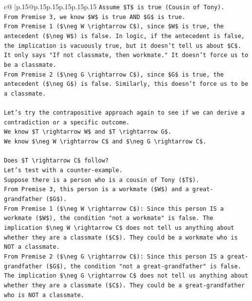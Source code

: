 \documentclass{article}
\begin{document}
{\begin{supertabular}{c@{$\;$}|p{.15\linewidth}@{}p{.15\linewidth}p{.15\linewidth}p{.15\linewidth}p{.15\linewidth}p{.15\linewidth}}
{{{\texttt{Assume \$T\$ is true (Cousin of Tony).} \\
\texttt{From Premise 3, we know \$W\$ is true AND \$G\$ is true.} \\
\texttt{From Premise 1 (\$\textbackslash{}neg W \textbackslash{}rightarrow C\$), since \$W\$ is true, the antecedent (\$\textbackslash{}neg W\$) is false. In logic, if the antecedent is false, the implication is vacuously true, but it doesn't tell us about \$C\$. It only says "If not classmate, then workmate." It doesn't force us to be a classmate.} \\
\texttt{From Premise 2 (\$\textbackslash{}neg G \textbackslash{}rightarrow C\$), since \$G\$ is true, the antecedent (\$\textbackslash{}neg G\$) is false. Similarly, this doesn't force us to be a classmate.} \\
\\ 
\texttt{Let's try the contrapositive approach again to see if we can derive a contradiction or a specific outcome.} \\
\texttt{We know \$T \textbackslash{}rightarrow W\$ and \$T \textbackslash{}rightarrow G\$.} \\
\texttt{We know \$\textbackslash{}neg W \textbackslash{}rightarrow C\$ and \$\textbackslash{}neg G \textbackslash{}rightarrow C\$.} \\
\\ 
\texttt{Does \$T \textbackslash{}rightarrow C\$ follow?} \\
\texttt{Let's test with a counter{-}example.} \\
\texttt{Suppose there is a person who is a cousin of Tony (\$T\$).} \\
\texttt{From Premise 3, this person is a workmate (\$W\$) and a great{-}grandfather (\$G\$).} \\
\texttt{From Premise 1 (\$\textbackslash{}neg W \textbackslash{}rightarrow C\$): Since this person IS a workmate (\$W\$), the condition "not a workmate" is false. The implication \$\textbackslash{}neg W \textbackslash{}rightarrow C\$ does not tell us anything about whether they are a classmate (\$C\$). They could be a workmate who is NOT a classmate.} \\
\texttt{From Premise 2 (\$\textbackslash{}neg G \textbackslash{}rightarrow C\$): Since this person IS a great{-}grandfather (\$G\$), the condition "not a great{-}grandfather" is false. The implication \$\textbackslash{}neg G \textbackslash{}rightarrow C\$ does not tell us anything about whether they are a classmate (\$C\$). They could be a great{-}grandfather who is NOT a classmate.} \\
}}}
\end{supertabular}}
\end{document}
